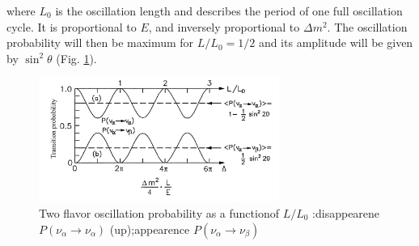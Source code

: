 \documentclass[12pt,a4paper,openright,twoside]{report}
\begin{document}
where $L_0$ is the oscillation length and describes the period of one full oscillation cycle. It is proportional to $E$, and inversely proportional to $\Delta m^2$. The oscillation probability will then be maximum for $L/L_0=1/2$ and its amplitude will be given by $\sin^2\theta$ (Fig. \ref{2oscillation:fig}). 
\begin{figure}
	\centering
	\includegraphics[width=0.7\textwidth]{2flavor_oscillation.png}
	\caption{\label{2oscillation:fig} Two flavor oscillation probability as a functionof $L/L_0$ :disappearene $P(\nu_\alpha\rightarrow \nu_\alpha)$ (up);appearence $P(\nu_\alpha\rightarrow \nu_\beta)$ }
\end{figure}
\end{document}
